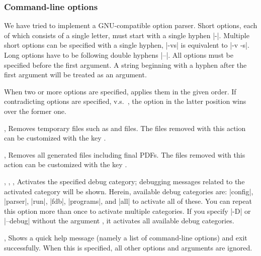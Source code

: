 \documentclass[draft]{llmk-doc}
\begin{document}
\subsubsection*{Command-line options }
\enlargethispage{5mm}%

We have tried to implement a GNU-compatible option parser. Short options, each of
which consists of a single letter, must start with a single hyphen |-|.
Multiple short options can be specified with a single hyphen, \eg |-vs| is
equivalent to |-v -s|. Long options have to be following double hyphens |--|.
All options must be specified before the first argument. A string beginning
with a hyphen after the first argument will be treated as an argument.

When two or more options are specified,  applies them in the given
order. If contradicting options are specified, \eg {} v.s.\ , the
option in the latter position wins over the former one.

\begin{clopt}{, }
Removes temporary files such as  and  files. The files
removed with this action can be customized with the key .
\end{clopt}

\begin{clopt}{, }
Removes all generated files including final PDFs. The files removed with this
action can be customized with the key .
\end{clopt}

\begin{clopt}{%
  , ,
  , }
Activates the specified debug category; debugging messages related to the
activated category will be shown. Herein, available debug categories are:
|config|, |parser|, |run|, |fdb|, |programs|, and |all| to activate all of
these. You can repeat this option more than once to activate multiple
categories. If you specify |-D| or |--debug| without the argument
, it activates all available debug categories.
\end{clopt}

\begin{clopt}{, }
Shows a quick help message (namely a list of command-line options) and exit
successfully. When this is specified, all other options and arguments are
ignored.
\end{clopt}
\end{document}
